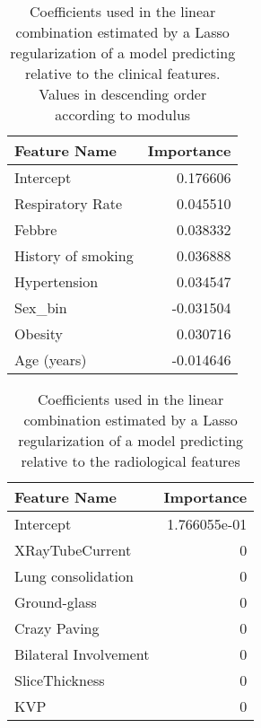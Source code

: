 \begin{table}
\caption{Coefficients used in the linear combination estimated by a Lasso regularization of a model predicting \icu relative to the clinical features. Values in descending order according to modulus\label{tab:ParamCli}}
\centering
	\begin{tabular}{lr}
	\toprule
	Feature Name &   Importance \\
	\midrule
	Intercept          &                      0.176606 \\
	Respiratory Rate   &                      0.045510 \\
	Febbre             &                      0.038332 \\
	History of smoking &                      0.036888 \\
	Hypertension       &                      0.034547 \\
	Sex\_bin            &                     -0.031504 \\
	Obesity            &                      0.030716 \\
	Age (years)        &                     -0.014646 \\
	\bottomrule
	\end{tabular}
\end{table}


\begin{table}
	\caption{Coefficients used in the linear combination estimated by a Lasso regularization of a model predicting \icu relative to the radiological features\label{tab:ParamRadiologiche}} 
		\centering
			\begin{tabular}{lr}
			\toprule
			Feature Name &   Importance \\
			\midrule
			Intercept             &                  1.766055e-01 \\
			XRayTubeCurrent       &                  0 \\
			Lung consolidation    &                  0\\
			Ground-glass          &                  0\\
			Crazy Paving          &                  0 \\
			Bilateral Involvement &                  0 \\
			SliceThickness        &                 0\\
			KVP                   &                  0 \\
			\bottomrule
			\end{tabular}
\end{table}


